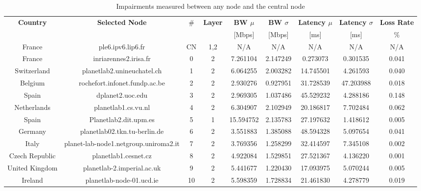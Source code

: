 
\begin{table*} [tb]
\centering
\footnotesize%
\caption{Impairments measured between any node and the central node}\label{table:Nodes}
\begin{tabular}{|c|c|c|c|c|c|c|c|c|}\hline
\textbf{Country} & \textbf{Selected Node} & \textbf{$\#$} & \textbf{Layer} &\textbf{BW $\mu$} & \textbf{BW $\sigma$} &\textbf{Latency $\mu$} &\textbf{Latency $\sigma$} &\textbf{Loss Rate}\\
                &                         &               &                &         [Mbps]   &      [Mbps]          &         [ms]          &      [ms]                &    $\%$\\\hline
        France & ple6.ipv6.lip6.fr                      & CN &1,2 &N/A&N/A&N/A&N/A&N/A\\\hline
        France & inriarennes2.irisa.fr                  & 0   &  2 &7.261104&2.147249&0.273073&0.301535&0.041\\\hline
        Switzerland & planetlab2.unineuchatel.ch        & 1   &  2 &6.064255&2.003282&14.745501&4.261593&0.040\\\hline
        Belgium & rochefort.infonet.fundp.ac.be         & 2   &  2 &2.930276&0.927951&31.728539&47.203988&0.018\\\hline
        Spain & dplanet2.uoc.edu                        & 3   &  2 &2.969305&1.037486&45.529232&4.288186&0.148\\\hline
        Netherlands & planetlab1.cs.vu.nl               & 4   &  2 &6.304907&2.102949&20.186817&7.702484&0.062\\\hline
        Spain & Planetlab2.dit.upm.es                   & 5   &  1 &15.594752&2.135783&27.197632&1.418612&0.005\\\hline
        Germany & planetlab02.tkn.tu-berlin.de          & 6   &  2 &3.551883&1.385088&48.594328&5.097654&0.041\\\hline
        Italy & planet-lab-node1.netgroup.uniroma2.it   & 7   &  2 &3.769356&1.258299&32.414597&7.345108&0.002\\\hline
        Czech Republic & planetlab1.cesnet.cz           & 8   &  2 &4.922084&1.529851&27.521367&4.136220&0.001\\\hline
        United Kingdom & planetlab-2.imperial.ac.uk     & 9   &  2 &5.441677&1.220430&17.093975&5.070244&0.005\\\hline
        Ireland & planetlab-node-01.ucd.ie              & 10  &  2 &5.598359&1.728834&21.461830&4.278779&0.019\\\hline

\end{tabular}
\end{table*}
